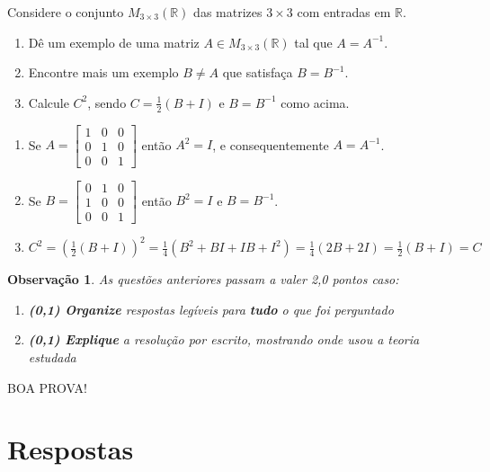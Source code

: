 \documentclass[12pt,a4paper]{article}
\newtheorem*{note}{Observação}
\newcommand*\R{\mathbb{R}}
\begin{document}
\begin{ExerciseList}
\Exercise[title={1,8}] Considere o conjunto $M_{3 \times 3} (\R)$ das matrizes $3 \times 3$ com entradas em $\R$.
\begin{enumerate}
\item Dê um exemplo de uma matriz $A \in M_{3 \times 3} (\R)$ tal que $A = A^{-1}$.
\item Encontre mais um exemplo $B \neq A$ que satisfaça $B = B^{-1}$.
\item Calcule $C^2$, sendo $C = \frac{1}{2}(B + I)$ e $B = B^{-1}$ como acima.
\end{enumerate}

\Answer
\begin{enumerate}
\item
Se $A = \begin{bmatrix}
1 & 0 & 0\\
0 & 1 & 0\\
0 & 0 & 1
\end{bmatrix}$ então $A^2 = I$, e consequentemente $A = A^{-1}$.
\item Se $B = \begin{bmatrix}
0 & 1 & 0 \\
1 & 0 & 0 \\
0 & 0 & 1
\end{bmatrix}$ então $B^2 = I$ e $B = B^{-1}$.
\item $C^2 = \left( \frac{1}{2}(B+I) \right)^2
= \frac{1}{4}(B^2 + BI + IB + I^2)
= \frac{1}{4}(2B + 2I)
= \frac{1}{2}(B + I) = C$
\end{enumerate}
\end{ExerciseList}

\medskip
\begin{note}
As questões anteriores passam a valer 2,0 pontos caso:
\begin{enumerate}
\item \textbf{(0,1) Organize} respostas legíveis para \textbf{tudo} o que foi perguntado
\item \textbf{(0,1) Explique} a resolução por escrito, mostrando onde usou a teoria estudada
\end{enumerate}
\end{note}

\begin{center}
BOA PROVA!
\end{center}

\newpage
\restoregeometry
\section*{Respostas}
\shipoutAnswer
\end{document}
